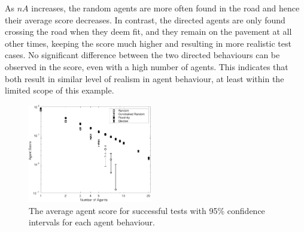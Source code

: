 \documentclass[letterpaper, 10 pt, journal, twoside]{IEEEtran}
\begin{document}

As $nA$ increases, the random agents are more often found in the road and hence their average score decreases. In contrast, the directed agents are only found crossing the road when they deem fit, and they remain on the pavement at all other times, keeping the score much higher and resulting in more realistic test cases.
%
%
%
No significant difference between the two directed behaviours can be observed in the score, even with a high number of agents. This indicates that  both result in similar level of realism in agent behaviour, at least within the limited scope of this example.


\begin{figure}[!t]
	\centering
\includegraphics[width=0.48\textwidth]{AgentScore.pdf}
	\caption{The average agent score for successful tests with 95\% confidence intervals for each agent behaviour.}%
	\label{f:agentscore}
\end{figure}


\end{document}
